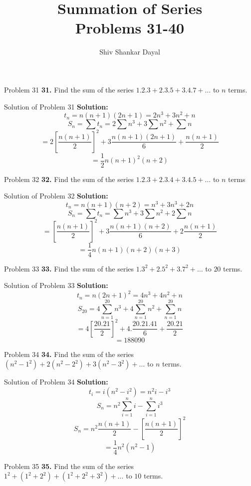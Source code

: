\documentclass[aspectratio=1610,8pt]{beamer}
\title{Summation of Series\\Problems 31-40}
\author[Shiv Shankar Dayal]{Shiv Shankar Dayal}
\begin{document}
\begin{frame}
  \titlepage
\end{frame}
\begin{frame}{Problem 31}
  \textbf{31.} Find the sum of the series $1.2.3 + 2.3.5 + 3.4.7 + \ldots$ to $n$ terms.
\end{frame}
\begin{frame}{Solution of Problem 31}
  \textbf{Solution:} $$t_n = n(n + 1)(2n + 1) = 2n^3 + 3n^2 + n$$
  $$S_n = \sum t_n = 2\sum n^3 + 3\sum n^2 + \sum n$$
  $$= 2\left[\frac{n(n + 1)}{2}\right]^2 + 3\frac{n(n + 1)(2n + 1)}{6} + \frac{n(n + 1)}{2}$$
  $$= \frac{1}{2}n(n + 1)^2(n + 2)$$
\end{frame}
\begin{frame}{Problem 32}
  \textbf{32.} Find the sum of the series $1.2.3 + 2.3.4 + 3.4.5 + \ldots$ to $n$ terms
\end{frame}
\begin{frame}{Solution of Problem 32}
  \textbf{Solution:} $$t_n = n(n + 1)(n + 2) = n^3 + 3n^3 + 2n$$
  $$S_n = \sum t_n = \sum n^3 + 3\sum n^2 + 2\sum n$$
  $$= \left[\frac{n(n + 1)}{2}\right]^2 + 3\frac{n(n + 1)(n + 2)}{6} + 2\frac{n(n + 1)}{2}$$
  $$= \frac{1}{4}n(n + 1)(n + 2)(n + 3)$$
\end{frame}
\begin{frame}{Problem 33}
  \textbf{33.} Find the sum of the series $1.3^2 + 2.5^2 + 3.7^2 + \ldots$ to $20$ terms.
\end{frame}
\begin{frame}{Solution of Problem 33}
  \textbf{Solution:} $$t_n = n(2n + 1)^2 = 4n^3 + 4n^2 + n$$
  $$S_{20} = 4\sum_{n = 1}^{20}n^3 + 4\sum_{n = 1}^{20}n^2 + \sum_{n = 1}^{20}n$$
  $$= 4\left[\frac{20.21}{2}\right]^2 + 4.\frac{20.21.41}{6} + \frac{20.21}{2}$$
  $$= 188090$$
\end{frame}
\begin{frame}{Problem 34}
  \textbf{34.} Find the sum of the series $(n^2 - 1^2) + 2(n^2 - 2^2) + 3(n^2 - 3^2) + \ldots$ to $n$ terms.
\end{frame}
\begin{frame}{Solution of Problem 34}
  \textbf{Solution:}$$t_i = i(n^2 - i^2) = n^2i -i^3$$
  $$S_n = n^2\sum_{i = 1}^n i - \sum_{i = 1}^n i^3$$
  $$S_n = n^2\frac{n(n + 1)}{2} - \left[\frac{n(n + 1)}{2}\right]^2$$
  $$ = \frac{1}{4}n^2(n^2 - 1)$$
\end{frame}
\begin{frame}{Problem 35}
  \textbf{35.} Find the sum of the series $1^2 + (1^2 + 2^2) + (1^2 + 2^2 + 3^2) + \ldots$ to $10$ terms.
\end{frame}
\end{document}
